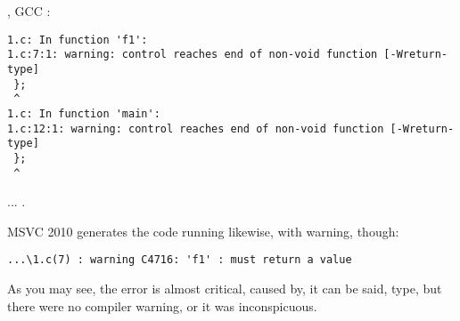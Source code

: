  , \ac{GCC} 
:

\begin{lstlisting}
1.c: In function 'f1':
1.c:7:1: warning: control reaches end of non-void function [-Wreturn-type]
 };
 ^
1.c: In function 'main':
1.c:12:1: warning: control reaches end of non-void function [-Wreturn-type]
 };
 ^
\end{lstlisting}

... .

MSVC 2010 
{generates the code running likewise, with warning, though}:

\begin{lstlisting}
...\1.c(7) : warning C4716: 'f1' : must return a value
\end{lstlisting}

{As you may see, the error is almost critical, caused by, it can be said, type, but there were no
compiler warning, or it was inconspicuous}.

